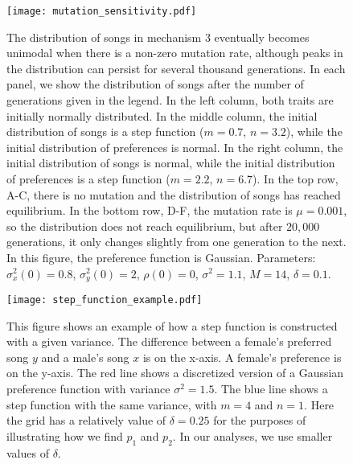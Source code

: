 \documentclass{article}
\begin{document}
\begin{figure}
\texttt{[image: mutation\_sensitivity.pdf]}
\caption{\label{mut_sensitivity} The distribution of songs in mechanism 3 eventually becomes unimodal when there is a non-zero mutation rate, although peaks in the distribution can persist for several thousand generations. In each panel, we show the distribution of songs after the number of generations given in the legend. In the left column, both traits are initially normally distributed. In the middle column, the initial distribution of songs is a step function ($m=0.7$, $n=3.2$), while the initial distribution of preferences is normal. In the right column, the initial distribution of songs is normal, while the initial distribution of preferences is a step function ($m=2.2$, $n=6.7$). In the top row, A-C, there is no mutation and the distribution of songs has reached equilibrium. In the bottom row, D-F, the mutation rate is $\mu=0.001$, so the distribution does not reach equilibrium, but after $20,000$ generations, it only changes slightly from one generation to the next. In this figure, the preference function is Gaussian.  Parameters: $\sigma_x^2(0)=0.8$, $\sigma_y^2(0)=2$, $\rho(0)=0$, $\sigma^2=1.1$, $M=14$, $\delta=0.1$. }
\end{figure}

\begin{figure}[tp]
\texttt{[image: step\_function\_example.pdf]}
\caption{\label{step_ex}This figure shows an example of how a step function is constructed with a given variance. The difference between a female's preferred song $y$ and a male's song $x$ is on the x-axis. A female's preference is on the y-axis. The red line shows a discretized version of a Gaussian preference function with variance $\sigma^2=1.5$. The blue line shows a step function with the same variance, with $m=4$ and $n=1$. Here the grid has a relatively value of $\delta=0.25$ for the purposes of illustrating how we find $p_1$ and $p_2$. In our analyses, we use smaller values of $\delta$. }
\end{figure}
\end{document}
